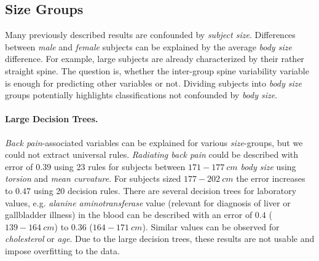 \documentclass[a4paper,twoside]{style/article}
\newcommand{\com}[1]{\textcolor{orange}{\uline{#1}}}
\begin{document}
%
%

\subsection{Size Groups}
Many previously described results are confounded by \emph{subject size}.
Differences between \emph{male} and \emph{female} subjects can be explained by the average \emph{body size} difference.
For example, large subjects are already characterized by their rather straight spine.
%
The question is, whether the inter-group spine variability variable is enough for predicting other variables or not.
Dividing subjects into \emph{body size} groups potentially highlights classifications not confounded by \emph{body size}.
\paragraph{Large Decision Trees. }
\emph{Back pain}-associated variables can be explained for various \emph{size}-groups, but we could not extract universal rules.
\emph{Radiating back pain} could be described with error of $0.39$ using 23 rules for subjects between \emph{$171-177~cm$ body size} using \emph{torsion} and \emph{mean curvature}.
For subjects sized \emph{$177-202~cm$} the error increases to $0.47$ using 20 decision rules.
There are several decision trees for laboratory values, e.g. \emph{alanine aminotransferase} value (relevant for diagnosis of liver or gallbladder illness) in the blood can be described with an error of $0.4$ (\emph{$139-164~cm$}) to $0.36$ (\emph{$164 - 171~cm$}).
Similar values can be observed for \emph{cholesterol} or \emph{age}.
Due to the large decision trees, these results are not usable and impose overfitting to the data.
\end{document}
